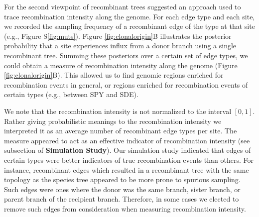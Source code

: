 \documentclass[english]{article}
\begin{document}
For the second viewpoint of recombinant trees \citet{Didelot2010} suggested an
approach used to trace recombination intensity along the genome.  For each edge
type and each site, we recorded the sampling frequency of a recombinant edge of
the type at that site (e.g., Figure S\ref{fig:muts}).  Figure
\ref{fig:clonalorigin}B illustrates the posterior probability that a site
experiences influx from a donor branch using a single recombinant tree.  Summing
these posteriors over a certain set of edge types, we could obtain a measure of
recombination intensity along the genome (Figure \ref{fig:clonalorigin}B).  This
allowed us to find genomic regions enriched for recombination events in general,
or regions enriched for recombination events of certain types (e.g., between SPY
and SDE).  

We note that the recombination intensity is not normalized to
the interval $[0,1]$. Rather giving probabilistic meanings to the recombination
intensity we interpreted it as an average number of recombinant edge types per
site.  The measure appeared to act as an effective indicator of recombination
intensity (see subsection of \textbf{Simulation Study}).  Our simulation study
indicated that edges of certain types were better indicators of true
recombination events than others. For instance, recombinant edges which resulted
in a recombinant tree with the same topology as the species tree appeared to be
more prone to spurious sampling.  Such edges were ones where the donor was the
same branch, sister branch, or parent branch of the recipient branch.
Therefore, in some cases we elected to remove such edges from consideration when
measuring recombination intensity.
\end{document}
